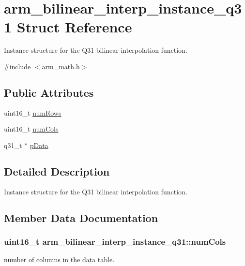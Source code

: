 \hypertarget{structarm__bilinear__interp__instance__q31}{}\section{arm\+\_\+bilinear\+\_\+interp\+\_\+instance\+\_\+q31 Struct Reference}
\label{structarm__bilinear__interp__instance__q31}


Instance structure for the Q31 bilinear interpolation function.  




{\ttfamily \#include $<$arm\+\_\+math.\+h$>$}

\subsection*{Public Attributes}
\begin{DoxyCompactItemize}
\item 
uint16\+\_\+t \hyperlink{structarm__bilinear__interp__instance__q31_a2082e3eac56354d75291f03e96ce4aa5}{num\+Rows}
\item 
uint16\+\_\+t \hyperlink{structarm__bilinear__interp__instance__q31_a6c3eff4eb17ff1d43f170efb84713a2d}{num\+Cols}
\item 
q31\+\_\+t $\ast$ \hyperlink{structarm__bilinear__interp__instance__q31_a843eae0c9db5f815e77e1aaf9afea358}{p\+Data}
\end{DoxyCompactItemize}


\subsection{Detailed Description}
Instance structure for the Q31 bilinear interpolation function. 

\subsection{Member Data Documentation}
\subsubsection[{\texorpdfstring{num\+Cols}{numCols}}]{\setlength{\rightskip}{0pt plus 5cm}uint16\+\_\+t arm\+\_\+bilinear\+\_\+interp\+\_\+instance\+\_\+q31\+::num\+Cols}\hypertarget{structarm__bilinear__interp__instance__q31_a6c3eff4eb17ff1d43f170efb84713a2d}{}\label{structarm__bilinear__interp__instance__q31_a6c3eff4eb17ff1d43f170efb84713a2d}
number of columns in the data table. 

